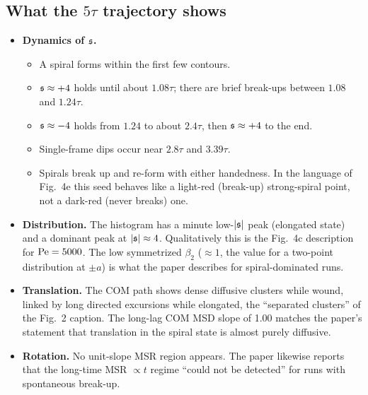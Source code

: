 \subsection{What the $5\tau$ trajectory shows}
\begin{itemize}
\item \textbf{Dynamics of $\mathfrak{s}$.}
\begin{itemize}
\item A spiral forms within the first few contours.
\item $\mathfrak{s}\approx+4$ holds until about $1.08\tau$; there are brief break-ups between $1.08$ and $1.24\tau$.
\item $\mathfrak{s}\approx-4$ holds from $1.24$ to about $2.4\tau$, then $\mathfrak{s}\approx+4$ to the end.
\item Single-frame dips occur near $2.8\tau$ and $3.39\tau$.
\item Spirals break up and re-form with either handedness. In the language of Fig.~4e this seed behaves like a light-red (break-up) strong-spiral point, not a dark-red (never breaks) one.
\end{itemize}
\item \textbf{Distribution.} The histogram has a minute low-$|\mathfrak{s}|$ peak (elongated state) and a dominant peak at $|\mathfrak{s}|\approx4$. Qualitatively this is the Fig.~4c description for $\mathrm{Pe}=5000$.
The low symmetrized $\beta_2$ ($\approx1$, the value for a two-point distribution at $\pm a$) is what the paper describes for spiral-dominated runs.
\item \textbf{Translation.} The COM path shows dense diffusive clusters while wound, linked by long directed excursions while elongated, the ``separated clusters'' of the Fig.~2 caption.
The long-lag COM MSD slope of 1.00 matches the paper's statement that translation in the spiral state is almost purely diffusive.
\item \textbf{Rotation.} No unit-slope MSR region appears. The paper likewise reports that the long-time MSR $\propto t$ regime ``could not be detected'' for runs with spontaneous break-up.
\end{itemize}

